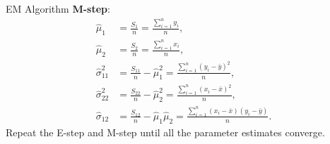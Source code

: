 \begin{Example}{EM Algorithm}
    \textbf{M-step}:
    \begin{align*}
        \hat{\mu}_1
         & =\frac{S_1}{n}=\frac{\sum_{i=1}^{n}y_i}{n}, \\
        \hat{\mu}_2
         & =\frac{S_2}{n}=\frac{\sum_{i=1}^{n}x_i}{n}, \\
        \hat{\sigma}_{11}^2
         & =\frac{S_{11}}{n}-\hat{\mu}_1^2
        =\frac{\sum_{i=1}^{n}(y_i-\bar{y})^2}{n},      \\
        \hat{\sigma}_{22}^2
         & =\frac{S_{22}}{n}-\hat{\mu}_2^2
        =\frac{\sum_{i=1}^{n}(x_i-\bar{x})^2}{n},      \\
        \hat{\sigma}_{12}
         & =\frac{S_{12}}{n}-\hat{\mu}_1\hat{\mu}_2
        =\frac{\sum_{i=1}^{n}(x_i-\bar{x})(y_i-\bar{y})}{n}.
    \end{align*}
    Repeat the E-step and M-step until all the parameter estimates converge.
\end{Example}